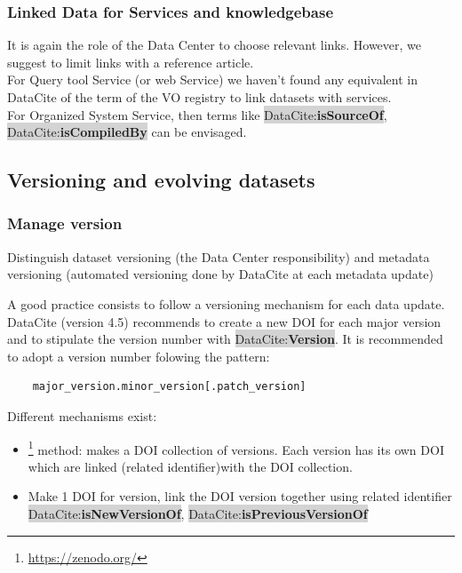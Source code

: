 \documentclass[11pt,a4paper]{ivoa}
\newcommand{\dataciteterm}[1]{\colorbox{lightgray}{DataCite:\textbf{#1}}}
\begin{document}
\subsubsection{Linked Data for Services and knowledgebase}
\label{sec:linkedataServiceKnowledgebase}
It is again the role of the Data Center to choose relevant links. However, we suggest to limit links with a reference article.\\

For Query tool Service (or web Service) we haven't found any equivalent in DataCite of the  term of the VO registry to link datasets with services. \\

For Organized System Service, then terms like \dataciteterm{isSourceOf}, \dataciteterm{isCompiledBy} can be envisaged.



\subsection{Versioning and evolving datasets}
\label{sec:version}

\subsubsection{Manage version}
Distinguish dataset versioning (the Data Center responsibility) and metadata versioning (automated versioning done by DataCite at each metadata update)

A good practice consists to follow a versioning mechanism for each data update. DataCite (version 4.5) recommends to create a new DOI for each major version and to stipulate the version number with \dataciteterm{Version}. 
It is recommended to adopt a version number folowing the pattern:
\begin{verbatim}
	major_version.minor_version[.patch_version]
\end{verbatim}


Different mechanisms exist:
\begin{itemize}
\item  \footnote{\url{https://zenodo.org/}} method: makes a DOI collection of versions. Each version has its own DOI which are linked (related identifier)with the DOI collection.
\item Make 1 DOI for version, link the DOI version together using related identifier \dataciteterm{isNewVersionOf}, \dataciteterm{isPreviousVersionOf}
\end{itemize}
\end{document}

